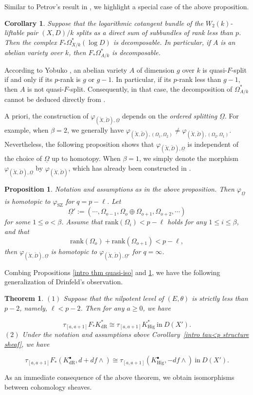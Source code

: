 \documentclass[12pt, a4paper]{article}
\newtheorem{proposition}{Proposition}[section]
\newtheorem{theorem}{Theorem}[section]
\newtheorem{corollary}{Corollary}[section]
\begin{document}
Similar to Petrov's result in \cite{P2}, we highlight a special case of the above proposition.

\begin{corollary}
Suppose that the logarithmic cotangent bundle of the $W_2(k)$-liftable pair $(X,D)/k$ splits as a direct sum of subbundles of rank less than $p$. Then the complex $F_*\Omega^*_{X/k}(\log D)$ is decomposable. In particular, if $A$ is an abelian variety over $k$, then $F_*\Omega^*_{A/k}$ is decomposable.
\end{corollary}

According to Yobuko \cite{Y}, an abelian variety $A$ of dimension $g$ over $k$ is quasi-$F$-split if and only if its $p$-rank is $g$ or $g-1$. In particular, if its $p$-rank less than $g-1$, then $A$ is not quasi-$F$-split. Consequently, in that case, the decomposition of $\Omega^*_{A/k}$ cannot be deduced directly from \cite{P2}.

A priori, the construction of $\varphi_{(\tilde X,\tilde D),\underline{\Omega}}$ depends on the \emph{ordered splitting} $\underline{\Omega}$. For example, when $\beta = 2$, we generally have $\varphi_{(\tilde X,\tilde D),(\Omega_1, \Omega_2)} \neq \varphi_{(\tilde X,\tilde D),(\Omega_2, \Omega_1)}$. Nevertheless, the following proposition shows that $\varphi_{(\tilde X,\tilde D),\underline{\Omega}}$ is independent of the choice of $\underline{\Omega}$ up to homotopy. When $\beta = 1$, we simply denote the morphism $\varphi_{(\tilde X,\tilde D),\underline{\Omega}}$ by $\varphi_{(\tilde X,\tilde D)}$, which has already been constructed in \cite{SZ1}.


\begin{proposition}\label{intro thm homotopy}
 Notation and assumptions as in the above proposition. Then $\varphi_{\underline{\Omega}}$ is homotopic to $\varphi_{\mathrm{SZ}}$ for $q = p - \ell$. Let 
\[
\underline{\Omega}' := (\cdots, \Omega_{o-1}, \Omega_o \oplus \Omega_{o+1}, \Omega_{o+2}, \cdots)
\]
for some \(1 \leq o < \beta\). Assume that $\mathrm{rank}(\Omega_i) < p - \ell$ holds for any \(1 \leq i \leq \beta\), and that 
\[
\mathrm{rank}(\Omega_o) + \mathrm{rank}(\Omega_{o+1}) < p - \ell,
\]
then $\varphi_{(\tilde X,\tilde D),\underline{\Omega}}$ is homotopic to $\varphi_{(\tilde X,\tilde D),\underline{\Omega}'}$ for $q=\infty$.
\end{proposition}
Combing Propositions \ref{intro thm quasi-iso} and \ref{intro thm homotopy}, we have the following generalization of Drinfeld's observation. 
\begin{theorem}
$(1)$ Suppose that the nilpotent level of $(E, \theta)$ is strictly less than $p - 2$, namely, $\ell < p - 2$. Then for any $a \geq 0$, we have

$$
\tau_{[a,a+1]}F_*K^*_\mathrm{dR}\cong\tau_{[a,a+1]}K^*_\mathrm{Hig}~\mathrm{in}~D(X').
$$
$(2)$ Under the notation and assumptions above Corollary~\ref{intro tau<p structure sheaf}, we have

$$
\tau_{[a,a+1]}F_*(K^\bullet_\mathrm{dR},d+df\wedge)\cong\tau_{[a,a+1]}(K^\bullet_\mathrm{Hig},-df\wedge)~\mathrm{in}~D(X').
$$
\end{theorem}
As an immediate consequence of the above theorem, we obtain isomorphisms between cohomology sheaves.
\end{document}
